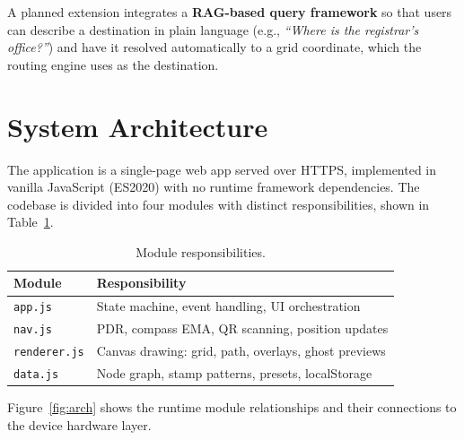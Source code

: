 \documentclass[12pt,a4paper]{article}
\begin{document}
A planned extension integrates a \textbf{RAG-based query framework} so that
users can describe a destination in plain language (e.g., \textit{``Where is
the registrar's office?''}) and have it resolved automatically to a grid
coordinate, which the routing engine uses as the destination.

\section{System Architecture}
\label{sec:arch}

The application is a single-page web app served over HTTPS, implemented in
vanilla JavaScript (ES2020) with no runtime framework dependencies. The codebase
is divided into four modules with distinct responsibilities, shown in
Table~\ref{tab:modules}.

\begin{table}[H]
\centering
\caption{Module responsibilities.}
\label{tab:modules}
\small
\begin{tabular}{@{}ll@{}}
\toprule
\textbf{Module} & \textbf{Responsibility} \\
\midrule
\texttt{app.js}      & State machine, event handling, UI orchestration \\
\texttt{nav.js}      & PDR, compass EMA, QR scanning, position updates \\
\texttt{renderer.js} & Canvas drawing: grid, path, overlays, ghost previews \\
\texttt{data.js}     & Node graph, stamp patterns, presets, localStorage \\
\bottomrule
\end{tabular}
\end{table}

Figure~\ref{fig:arch} shows the runtime module relationships and their
connections to the device hardware layer.
\end{document}
